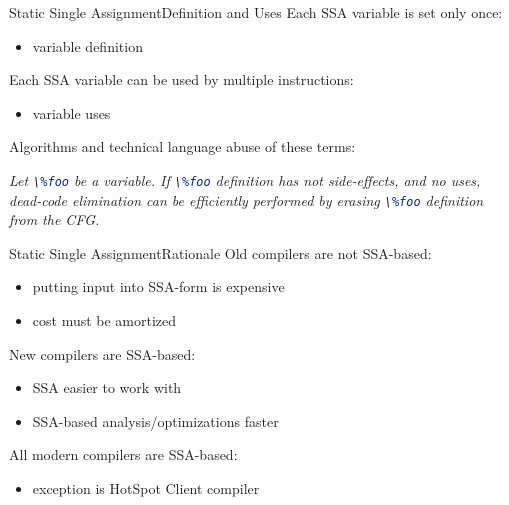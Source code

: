 \documentclass[10pt,mathserif]{beamer}
\newcommand{\llvminline}[1]{\lstinline[language=LLVM]!#1!}
\begin{document}
\begin{frame}{Static Single Assignment}{Definition and Uses}
Each SSA variable is set only once:

\begin{itemize}
\item variable \alert{definition}
\end{itemize}

Each SSA variable can be used by multiple instructions:

\begin{itemize}
\item variable \alert{uses}
\end{itemize}

Algorithms and technical language abuse of these terms:

\bigskip
\emph{
Let \llvminline{\%foo} be a variable. If \llvminline{\%foo} definition has not
side-effects, and no uses, dead-code elimination can be efficiently performed
by erasing \llvminline{\%foo} definition from the CFG.
}
\end{frame}

\begin{frame}{Static Single Assignment}{Rationale}
Old compilers are not SSA-based:

\begin{itemize}
\item putting input into SSA-form is expensive
\item cost must be amortized
\end{itemize}

New compilers are SSA-based:

\begin{itemize}
\item SSA easier to work with
\item SSA-based analysis/optimizations faster
\end{itemize}

All modern compilers are SSA-based:

\begin{itemize}
\item exception is HotSpot Client compiler
\end{itemize}
\end{frame}
\end{document}
